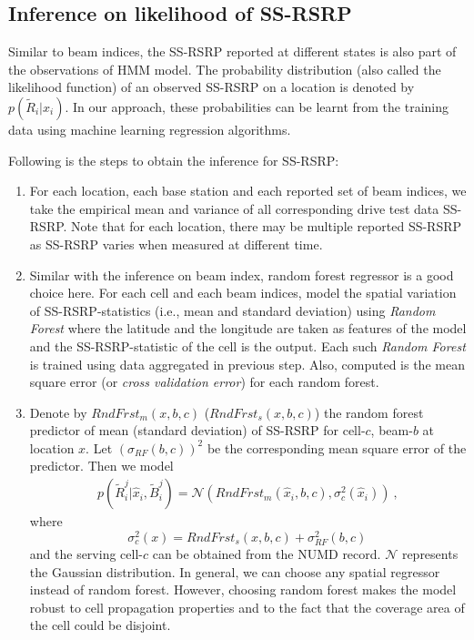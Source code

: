 \documentclass[conference, 10pt]{IEEEtran}
\begin{document}
\subsection{Inference on likelihood of SS-RSRP}
\label{sec:prob-reg}
Similar to beam indices, the SS-RSRP reported at different states
is also part of the observations of HMM model. The probability
distribution (also called the likelihood function) of an observed SS-RSRP on a location is denoted by
$p(\tilde{R}_i|\hat{x}_{i})$. In our approach, these probabilities
can be learnt from the training data using machine learning regression algorithms. 

Following is the steps to obtain the inference for SS-RSRP:

\begin{enumerate}
\item For each location, each base station and each reported set of beam indices, we
take the empirical mean and variance of all corresponding drive test data SS-RSRP. Note that for each location, there may be multiple reported SS-RSRP as SS-RSRP varies when measured at different time.

\item Similar with the inference on beam index, random forest regressor is a good choice here. For each cell and each beam indices, model the spatial variation of SS-RSRP-statistics (i.e., mean and
standard deviation) using {\em Random Forest} where the latitude and the longitude are 
taken as features of the model and the SS-RSRP-statistic  of the cell is the output. Each such {\em
Random Forest} is trained using data aggregated in previous step. Also,
computed is the mean square error (or {\em cross validation error})
for each random forest. 

\item Denote by $RndFrst_m(x,b,c)$ ($RndFrst_s(x,b,c)$) the random forest predictor of
mean (standard deviation) of SS-RSRP for cell-$c$, beam-$b$
at location $x$. Let $(\sigma_{RF}(b,c))^2$ be the corresponding
mean square error of the predictor. Then we model
\begin{align}
p(\tilde{R}^j_i|\hat{x}_{i}, \tilde{B}^j_i) =
\mathcal{N}(RndFrst_m(\hat{x}_{i},b,c), \sigma_c^2(\hat{x}_i))\ ,
\label{eqn:rndfrst}
\end{align}
where $$\sigma_c^2(x) = RndFrst_s(x,b,c) + \sigma_{RF}^2(b,c)\,$$ 
and the serving cell-$c$ can be obtained from the NUMD record. $\mathcal{N}$ represents the Gaussian distribution.
In general, we
can choose any spatial regressor instead of random forest. However, choosing
random forest makes the model robust to cell propagation properties and to the
fact that the coverage area of the cell could be disjoint.
\end{enumerate}
\end{document}
